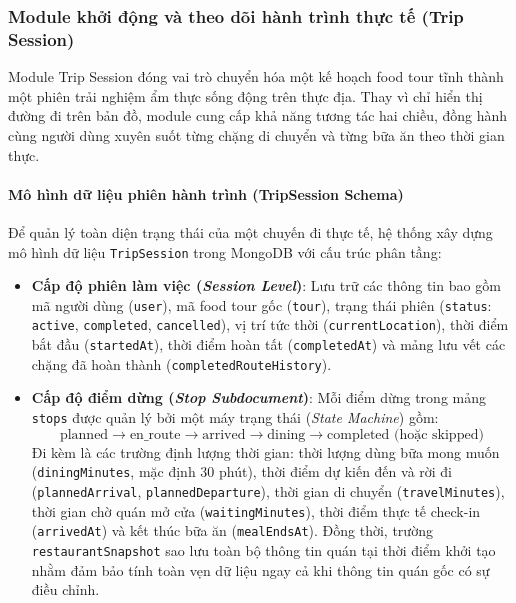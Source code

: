 \subsubsection{Module khởi động và theo dõi hành trình thực tế (Trip Session)}
Module Trip Session đóng vai trò chuyển hóa một kế hoạch food tour tĩnh thành một phiên trải nghiệm ẩm thực sống động trên thực địa. Thay vì chỉ hiển thị đường đi trên bản đồ, module cung cấp khả năng tương tác hai chiều, đồng hành cùng người dùng xuyên suốt từng chặng di chuyển và từng bữa ăn theo thời gian thực.

\paragraph{Mô hình dữ liệu phiên hành trình (TripSession Schema)}
Để quản lý toàn diện trạng thái của một chuyến đi thực tế, hệ thống xây dựng mô hình dữ liệu \texttt{TripSession} trong MongoDB với cấu trúc phân tầng:
\begin{itemize}[label=\textbullet]
    \item \textbf{Cấp độ phiên làm việc (\textit{Session Level})}: Lưu trữ các thông tin bao gồm mã người dùng (\texttt{user}), mã food tour gốc (\texttt{tour}), trạng thái phiên (\texttt{status}: \texttt{active}, \texttt{completed}, \texttt{cancelled}), vị trí tức thời (\texttt{currentLocation}), thời điểm bắt đầu (\texttt{startedAt}), thời điểm hoàn tất (\texttt{completedAt}) và mảng lưu vết các chặng đã hoàn thành (\texttt{completedRouteHistory}).
    \item \textbf{Cấp độ điểm dừng (\textit{Stop Subdocument})}: Mỗi điểm dừng trong mảng \texttt{stops} được quản lý bởi một máy trạng thái (\textit{State Machine}) gồm:
    \begin{equation*}
        \text{planned} \longrightarrow \text{en\_route} \longrightarrow \text{arrived} \longrightarrow \text{dining} \longrightarrow \text{completed (hoặc skipped)}
    \end{equation*}
    Đi kèm là các trường định lượng thời gian: thời lượng dùng bữa mong muốn (\texttt{diningMinutes}, mặc định 30 phút), thời điểm dự kiến đến và rời đi (\texttt{plannedArrival}, \texttt{plannedDeparture}), thời gian di chuyển (\texttt{travelMinutes}), thời gian chờ quán mở cửa (\texttt{waitingMinutes}), thời điểm thực tế check-in (\texttt{arrivedAt}) và kết thúc bữa ăn (\texttt{mealEndsAt}). Đồng thời, trường \texttt{restaurantSnapshot} sao lưu toàn bộ thông tin quán tại thời điểm khởi tạo nhằm đảm bảo tính toàn vẹn dữ liệu ngay cả khi thông tin quán gốc có sự điều chỉnh.
\end{itemize}

